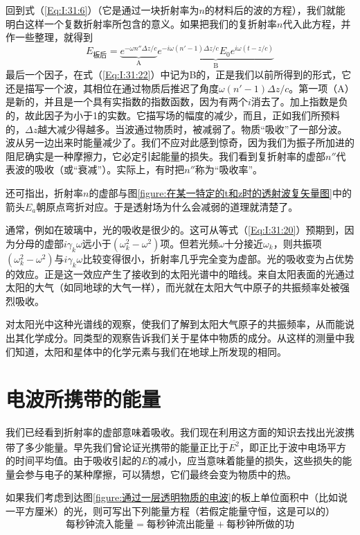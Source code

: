 回到式（\ref{Eq:I:31:6}）（它是通过一块折射率为$n$的材料后的波的方程），我们就能明白这样一个复数折射率所包含的意义。如果把我们的复折射率$n$代入此方程，并作一些整理，就得到
\begin{equation}
    \label{Eq:I:31:22}
    E_\text{板后} = \underbrace{e^{-\omega n'' \Delta z/c}}_{\text{A}}\underbrace{e^{-i\omega(n'-1)\Delta z/c}E_0e^{i\omega(t-z/c)}}_{\text{B}}
\end{equation}
最后一个因子，在式（\ref{Eq:I:31:22}）中记为B的，正是我们以前所得到的形式，它还是描写一个波，其相位在通过物质后推迟了角度$\omega(n'-1)\Delta z/c$。第一项（A）是新的，并且是一个具有实指数的指数函数，因为有两个$i$消去了。加上指数是负的，故此因子为小于1的实数。它描写场的幅度的减少，而且，正如我们所预料的，$\Delta z$越大减少得越多。当波通过物质时，被减弱了。物质“吸收”了一部分波。波从另一边出来时能量减少了。我们不应对此感到惊奇，因为我们为振子所加进的阻尼确实是一种摩擦力，它必定引起能量的损失。我们看到复折射率的虚部$n''$代表波的吸收（或“衰减”）。实际上，有时把$n''$称为“吸收率”。

还可指出，折射率$n$的虚部与图\ref{figure:在某一特定的t和z时的透射波复矢量图}中的箭头$E_a$朝原点弯折对应。于是透射场为什么会减弱的道理就清楚了。

通常，例如在玻璃中，光的吸收是很少的。这可从等式（\ref{Eq:I:31:20}）预期到，因为分母的虚部$i\gamma_k\omega$远小于$(\omega_k^2-\omega^2)$项。但若光频$\omega$十分接近$\omega_k$，则共振项$(\omega_k^2 - \omega^2)$与$i\gamma_k\omega$比较变得很小，折射率几乎完全变为虚部。光的吸收变为占优势的效应。正是这一效应产生了接收到的太阳光谱中的暗线。来自太阳表面的光通过太阳的大气（如同地球的大气一样），而光就在太阳大气中原子的共振频率处被强烈吸收。

对太阳光中这种光谱线的观察，使我们了解到太阳大气原子的共振频率，从而能说出其化学成分。同类型的观察告诉我们关于星体中物质的成分。从这样的测量中我们知道，太阳和星体中的化学元素与我们在地球上所发现的相同。

\section{电波所携带的能量}

我们已经看到折射率的虚部意味着吸收。我们现在利用这方面的知识去找出光波携带了多少能量。早先我们曾论证光携带的能量正比于$\overline{E^2}$，即正比于波中电场平方的时间平均值。由于吸收引起的$E$的减小，应当意味着能量的损失，这些损失的能量会参与电子的某种摩擦，可以猜想，它们最终会变为物质中的热。

如果我们考虑到达图\ref{figure:通过一层透明物质的电波}的板上单位面积中（比如说一平方厘米）的光，则可写出下列能量方程（若假定能量守恒，这是可以的）
\begin{equation}
    \label{Eq:I:31:23}
    \text{每秒钟流入能量}=\text{每秒钟流出能量}+\text{每秒钟所做的功}
\end{equation}

